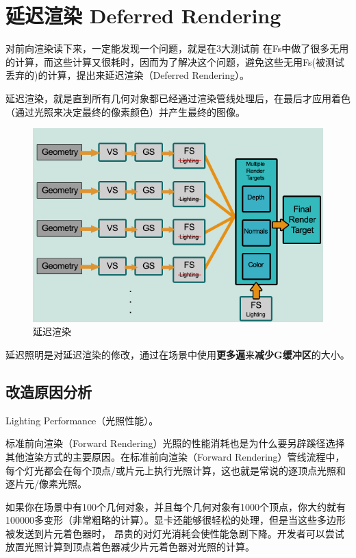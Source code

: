 \documentclass[UTF8,a4paper,12pt]{ctexbook}
\begin{document}
	\section{延迟渲染 Deferred Rendering}
		对前向渲染读下来，一定能发现一个问题，就是在3大测试前 在Fs中做了很多无用的计算，而这些计算又很耗时，因而为了解决这个问题，避免这些无用Fs(被测试丢弃的)的计算，提出来延迟渲染（Deferred Rendering）。
		
		延迟渲染，就是直到所有几何对象都已经通过渲染管线处理后，在最后才应用着色（通过光照来决定最终的像素颜色）并产生最终的图像。
		
		\begin{figure}[H]
			\centering
			\includegraphics[width=.9\linewidth]{Defferred}
			\caption{延迟渲染}
		\end{figure}
		
		延迟照明是对延迟渲染的修改，通过在场景中使用\textbf{更多遍}来\textbf{减少G缓冲区}的大小。
		
		\subsection{改造原因分析}
			Lighting Performance（光照性能）。
			
			标准前向渲染（Forward Rendering）光照的性能消耗也是为什么要另辟蹊径选择其他渲染方式的主要原因。在标准前向渲染（Forward Rendering）管线流程中，每个灯光都会在每个顶点/或片元上执行光照计算，这也就是常说的逐顶点光照和逐片元/像素光照。
			
			如果你在场景中有100个几何对象，并且每个几何对象有1000个顶点，你大约就有100000多变形（非常粗略的计算）。显卡还能够很轻松的处理，但是当这些多边形被发送到片元着色器时， 昂贵的对灯光消耗会使性能急剧下降。开发者可以尝试放置光照计算到顶点着色器减少片元着色器对光照的计算。
			
\end{document}

